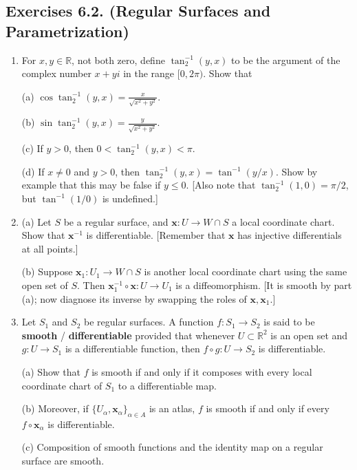 \documentclass[leqno]{book}
\begin{document}
\subsection*{Exercises 6.2. (Regular Surfaces and Parametrization)} %
\begin{enumerate}
\item For $x,y\in\mathbb R$, not both zero, define $\tan^{-1}_2(y,x)$ to be the argument of the complex number $x+yi$ in the range $[0,2\pi)$.  Show that

(a) $\cos\tan^{-1}_2(y,x)=\frac x{\sqrt{x^2+y^2}}$.

(b) $\sin\tan^{-1}_2(y,x)=\frac y{\sqrt{x^2+y^2}}$.

(c) If $y>0$, then $0<\tan^{-1}_2(y,x)<\pi$.

(d) If $x\ne 0$ and $y>0$, then $\tan^{-1}_2(y,x)=\tan^{-1}(y/x)$.  Show by example that this may be false if $y\leqslant 0$.  [Also note that $\tan^{-1}_2(1,0)=\pi/2$, but $\tan^{-1}(1/0)$ is undefined.]

\item (a) Let $S$ be a regular surface, and $\mathbf x:U\to W\cap S$ a local coordinate chart.  Show that $\mathbf x^{-1}$ is differentiable.  [Remember that $\mathbf x$ has injective differentials at all points.]

(b) Suppose $\mathbf x_1:U_1\to W\cap S$ is another local coordinate chart using the same open set of $S$.  Then $\mathbf x_1^{-1}\circ\mathbf x:U\to U_1$ is a diffeomorphism.  [It is smooth by part (a); now diagnose its inverse by swapping the roles of $\mathbf x,\mathbf x_1$.]

\item Let $S_1$ and $S_2$ be regular surfaces.  A function $f:S_1\to S_2$ is said to be \textbf{smooth} / \textbf{differentiable} provided that whenever $U\subset\mathbb R^2$ is an open set and $g:U\to S_1$ is a differentiable function, then $f\circ g:U\to S_2$ is differentiable.

(a) Show that $f$ is smooth if and only if it composes with every local coordinate chart of $S_1$ to a differentiable map.

(b) Moreover, if $\{U_\alpha,\mathbf x_\alpha\}_{\alpha\in A}$ is an atlas, $f$ is smooth if and only if every $f\circ\mathbf x_\alpha$ is differentiable.

(c) Composition of smooth functions and the identity map on a regular surface are smooth.


\end{enumerate}
\end{document}
